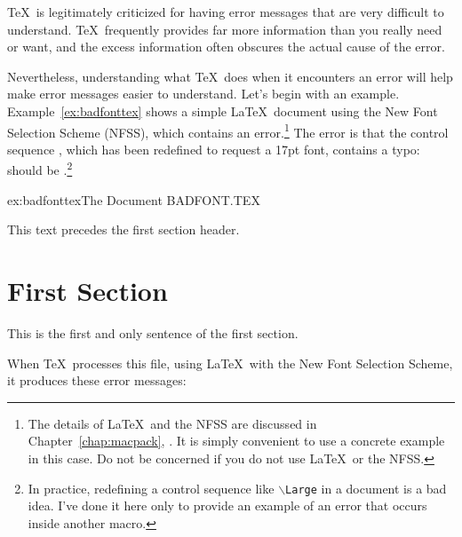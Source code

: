\TeX\ is legitimately criticized for having error messages that are
very difficult to understand.  \TeX\ frequently provides far more
information than you really need or want, and the excess information
often obscures the actual cause of the error.

Nevertheless, understanding what \TeX\ does when it encounters an error will
help make error messages easier to understand.  Let's begin with an example.
Example~\ref{ex:badfonttex} shows a simple \LaTeX\ document using the New Font
Selection Scheme (NFSS), which contains an error.\footnote{The details of
\LaTeX\ and the NFSS are discussed in Chapter~\ref{chap:macpack}, {\it
{}}.  It is simply convenient to use a concrete example
in this case.  Do not be concerned if you do not use \LaTeX\ or the NFSS.}
The error is that the control sequence , which has been redefined
to request a 17pt font, contains a typo:  should be
.\footnote{In practice, redefining a control sequence like
$\backslash$\texttt{Large} in a document is a bad idea.  I've done it here
only to provide an example of an error that occurs inside another macro.}

\begin{example}{ex:badfonttex}{The Document BADFONT.TEX}
%
%
\renewcommand{\Large}{\fontsiz{17}{20pt}\selectfont}


This text precedes the first section header.

%
\section{First Section}

This is the first and only sentence of the first section.


\end{example}

\newpage
When \TeX\ processes this file, using \LaTeX\ with the New Font
Selection Scheme, it produces these error messages:

